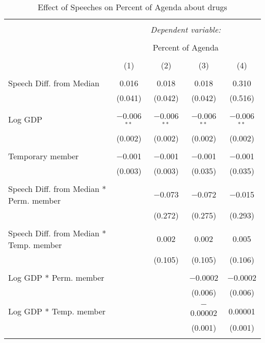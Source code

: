 
\begin{table}[!htbp] \centering 
  \caption{Effect of Speeches on Percent of Agenda about drugs} 
  \label{} 
\begin{tabular}{@{\extracolsep{5pt}}lcccc} 
\\[-1.8ex]\hline 
\hline \\[-1.8ex] 
 & \multicolumn{4}{c}{\textit{Dependent variable:}} \\ 
\cline{2-5} 
\\[-1.8ex] & \multicolumn{4}{c}{Percent of Agenda} \\ 
\\[-1.8ex] & (1) & (2) & (3) & (4)\\ 
\hline \\[-1.8ex] 
 Speech Diff. from Median & 0.016 & 0.018 & 0.018 & 0.310 \\ 
  & (0.041) & (0.042) & (0.042) & (0.516) \\ 
  & & & & \\ 
 Log GDP & $-$0.006$^{**}$ & $-$0.006$^{**}$ & $-$0.006$^{**}$ & $-$0.006$^{**}$ \\ 
  & (0.002) & (0.002) & (0.002) & (0.002) \\ 
  & & & & \\ 
 Temporary member & $-$0.001 & $-$0.001 & $-$0.001 & $-$0.001 \\ 
  & (0.003) & (0.003) & (0.035) & (0.035) \\ 
  & & & & \\ 
 Speech Diff. from Median * Perm. member &  & $-$0.073 & $-$0.072 & $-$0.015 \\ 
  &  & (0.272) & (0.275) & (0.293) \\ 
  & & & & \\ 
 Speech Diff. from Median * Temp. member &  & 0.002 & 0.002 & 0.005 \\ 
  &  & (0.105) & (0.105) & (0.106) \\ 
  & & & & \\ 
 Log GDP * Perm. member &  &  & $-$0.0002 & $-$0.0002 \\ 
  &  &  & (0.006) & (0.006) \\ 
  & & & & \\ 
 Log GDP * Temp. member &  &  & $-$0.00002 & 0.00001 \\ 
  &  &  & (0.001) & (0.001) \\ 
  & & & & \\ 

\end{tabular}
\end{table}
